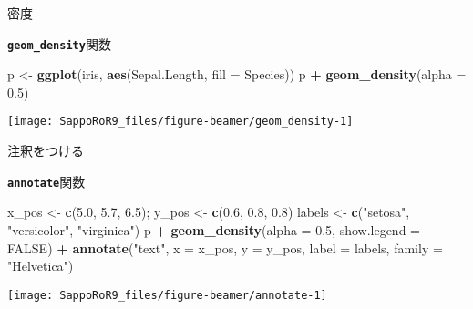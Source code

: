 \documentclass[ignorenonframetext,]{beamer}
\newenvironment{Shaded}{\begin{snugshade}}{\end{snugshade}}
\newcommand{\KeywordTok}[1]{\textcolor[rgb]{0.13,0.29,0.53}{\textbf{#1}}}
\newcommand{\DataTypeTok}[1]{\textcolor[rgb]{0.13,0.29,0.53}{#1}}
\newcommand{\FloatTok}[1]{\textcolor[rgb]{0.00,0.00,0.81}{#1}}
\newcommand{\StringTok}[1]{\textcolor[rgb]{0.31,0.60,0.02}{#1}}
\newcommand{\OtherTok}[1]{\textcolor[rgb]{0.56,0.35,0.01}{#1}}
\newcommand{\OperatorTok}[1]{\textcolor[rgb]{0.81,0.36,0.00}{\textbf{#1}}}
\newcommand{\NormalTok}[1]{#1}
\let\oldShaded\Shaded
\let\endoldShaded\endShaded
\renewenvironment{Shaded}{\footnotesize\oldShaded}{\endoldShaded}
\begin{document}
\begin{frame}[fragile]{密度}

\textbf{\texttt{geom\_density}}関数

\begin{Shaded}
\begin{Highlighting}[]
\NormalTok{p <-}\StringTok{ }\KeywordTok{ggplot}\NormalTok{(iris, }\KeywordTok{aes}\NormalTok{(Sepal.Length, }\DataTypeTok{fill =}\NormalTok{ Species))}
\NormalTok{p }\OperatorTok{+}\StringTok{ }\KeywordTok{geom_density}\NormalTok{(}\DataTypeTok{alpha =} \FloatTok{0.5}\NormalTok{)}
\end{Highlighting}
\end{Shaded}

\texttt{[image: SappoRoR9\_files/figure-beamer/geom\_density-1]}

\end{frame}

\begin{frame}[fragile]{注釈をつける}

\textbf{\texttt{annotate}}関数

\begin{Shaded}
\begin{Highlighting}[]
\NormalTok{x_pos <-}\StringTok{ }\KeywordTok{c}\NormalTok{(}\FloatTok{5.0}\NormalTok{, }\FloatTok{5.7}\NormalTok{, }\FloatTok{6.5}\NormalTok{); y_pos <-}\StringTok{ }\KeywordTok{c}\NormalTok{(}\FloatTok{0.6}\NormalTok{, }\FloatTok{0.8}\NormalTok{, }\FloatTok{0.8}\NormalTok{)}
\NormalTok{labels <-}\StringTok{ }\KeywordTok{c}\NormalTok{(}\StringTok{"setosa"}\NormalTok{, }\StringTok{"versicolor"}\NormalTok{, }\StringTok{"virginica"}\NormalTok{)}
\NormalTok{p }\OperatorTok{+}\StringTok{ }\KeywordTok{geom_density}\NormalTok{(}\DataTypeTok{alpha =} \FloatTok{0.5}\NormalTok{, }\DataTypeTok{show.legend =} \OtherTok{FALSE}\NormalTok{) }\OperatorTok{+}
\StringTok{  }\KeywordTok{annotate}\NormalTok{(}\StringTok{"text"}\NormalTok{, }\DataTypeTok{x =}\NormalTok{ x_pos, }\DataTypeTok{y =}\NormalTok{ y_pos, }\DataTypeTok{label =}\NormalTok{ labels,}
           \DataTypeTok{family =} \StringTok{"Helvetica"}\NormalTok{)}
\end{Highlighting}
\end{Shaded}

\texttt{[image: SappoRoR9\_files/figure-beamer/annotate-1]}

\end{frame}
\end{document}
